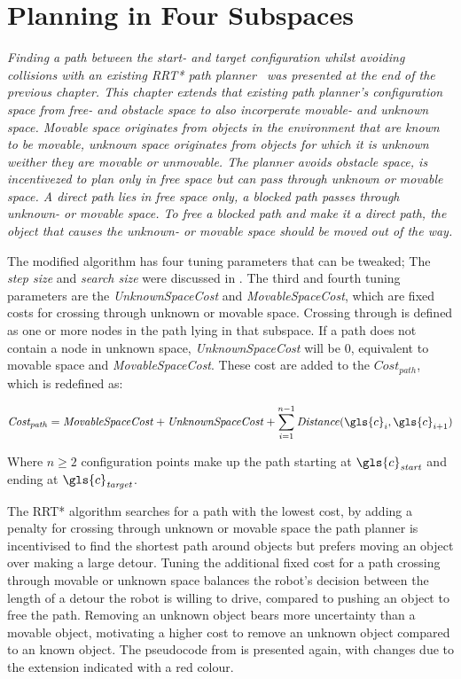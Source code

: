 \chapter{Planning in Four Subspaces}%
\label{chap:proposed_planning}
\textit{Finding a path between the start- and target configuration whilst avoiding collisions with an existing \ac{RRT*} path planner~\cite{chen_fast_2018} was presented at the end of the previous chapter. This chapter extends that existing path planner's configuration space from free- and obstacle space to also incorperate movable- and unknown space. Movable space originates from objects in the environment that are known to be movable, unknown space originates from objects for which it is unknown weither they are movable or unmovable. The planner avoids obstacle space, is incentivezed to plan only in free space but can pass through unknown or movable space. A direct path lies in free space only, a blocked path passes through unknown- or movable space. To free a blocked path and make it a direct path, the object that causes the unknown- or movable space should be moved out of the way.\bs}

The modified algorithm has four tuning parameters that can be tweaked; The \textit{step size} and \textit{search size} were discussed in . The third and fourth tuning parameters are the \textit{UnknownSpaceCost} and \textit{MovableSpaceCost}, which are fixed costs for crossing through unknown or movable space. Crossing through is defined as one or more nodes in the path lying in that subspace. If a path does not contain a node in unknown space, \textit{UnknownSpaceCost} will be 0, equivalent to movable space and \textit{MovableSpaceCost}. These cost are added to the $\mathit{Cost_{path}}$, which is redefined as:\bs

\[\mathit{Cost_{path}} = \mathit{MovableSpaceCost} + \mathit{UnknownSpaceCost} + \sum_{i=1}^{n-1} \mathit{Distance}(\gls{c}_i, \gls{c}_{i+1})\]

Where $\mathit{n} \geq 2$ configuration points make up the path starting at $\gls{c}_\mathit{start}$ and ending at $\gls{c}_\mathit{target}$.\bs

The \ac{RRT*} algorithm searches for a path with the lowest cost, by adding a penalty for crossing through unknown or movable space the path planner is incentivised to find the shortest path around objects but prefers moving an object over making a large detour. Tuning the additional fixed cost for a path crossing through movable or unknown space balances the robot's decision between the length of a detour the robot is willing to drive, compared to pushing an object to free the path. Removing an unknown object bears more uncertainty than a movable object, motivating a higher cost to remove an unknown object compared to an known object. The pseudocode from  is presented again, with changes due to the extension indicated with a red colour.\bs

